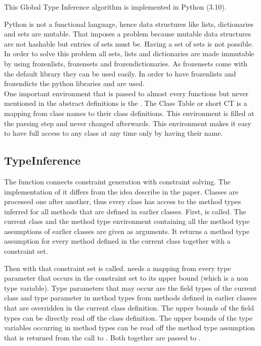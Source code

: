 This Global Type Inference algorithm is implemented in Python (3.10).

Python is not a functional language, hence data structures like lists, dictionaries and sets are mutable. That imposes a problem because mutable data structures are not hashable but entries of sets must be. Having a set of sets is not possible.
In order to solve this problem all sets, lists and dictionaries are made immutable by using frozenlists, frozensets and frozendictionaries. As frozensets come with the default library they can be used easily. In order to have frozenlists and frozendicts the python libraries  and  are used.\\
One important environment that is passed to almost every functions but never mentioned in the abstract definitions is the . The Class Table or short CT is a mapping from class names to their class definitions. This environment is filled at the parsing step and never changed afterwards. This environment makes it easy to have full access to any class at any time only by having their name.\\

\subsection{TypeInference}

The function  connects constraint generation with constraint solving. The implementation of it differs from the idea describe in the paper.
Classes are processed one after another, thus every class has access to the method types inferred for all methods that are defined in earlier classes.
First,  is called. The current class and the method type environment containing all the method type assumptions of earlier classes are given as arguments. It returns a method type assumption for every
method defined in the current class together with a constraint set.

Then  with that constraint set is called.  needs a mapping from every type parameter that occurs in the constraint set to its upper bound (which is a non type variable).
Type parameters that may occur are the field types of the current class and type parameter in method types from methods defined in earlier classes that are overridden in the current class definition.
The upper bounds of the field types can be directly read off the class definition. The upper bounds of the type variables occurring in method types can be read off the method type assumption that is returned from the call to .
Both together are passed to .

